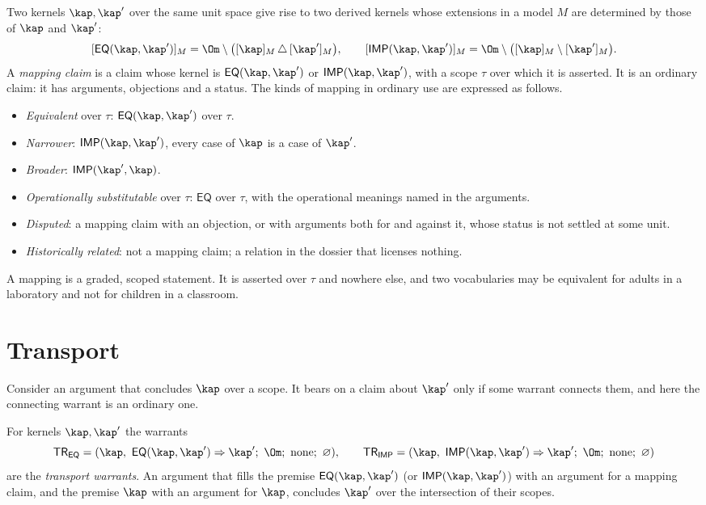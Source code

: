 Two kernels $\kap,\kap'$ over the same unit space give rise to two derived kernels whose extensions in a model $M$ are determined by those of $\kap$ and $\kap'$:
\[
[\mathsf{EQ}(\kap,\kap')]_M=\Om\setminus\bigl([\kap]_M\,\triangle\,[\kap']_M\bigr),\qquad
[\mathsf{IMP}(\kap,\kap')]_M=\Om\setminus\bigl([\kap]_M\setminus[\kap']_M\bigr).
\]
A \emph{mapping claim} is a claim whose kernel is $\mathsf{EQ}(\kap,\kap')$ or $\mathsf{IMP}(\kap,\kap')$, with a scope $\tau$ over which it is asserted. It is an ordinary claim: it has arguments, objections and a status. The kinds of mapping in ordinary use are expressed as follows.
\begin{itemize}
\item \emph{Equivalent} over $\tau$: $\mathsf{EQ}(\kap,\kap')$ over $\tau$.
\item \emph{Narrower}: $\mathsf{IMP}(\kap,\kap')$, every case of $\kap$ is a case of $\kap'$.
\item \emph{Broader}: $\mathsf{IMP}(\kap',\kap)$.
\item \emph{Operationally substitutable} over $\tau$: $\mathsf{EQ}$ over $\tau$, with the operational meanings named in the arguments.
\item \emph{Disputed}: a mapping claim with an objection, or with arguments both for and against it, whose status is not settled at some unit.
\item \emph{Historically related}: not a mapping claim; a relation in the dossier that licenses nothing.
\end{itemize}
A mapping is a graded, scoped statement. It is asserted over $\tau$ and nowhere else, and two vocabularies may be equivalent for adults in a laboratory and not for children in a classroom.

\section{Transport}\label{sec:transport}

Consider an argument that concludes $\kap$ over a scope. It bears on a claim about $\kap'$ only if some warrant connects them, and here the connecting warrant is an ordinary one.

\begin{definition}\label{def:transport}
For kernels $\kap,\kap'$ the warrants
\[
\mathsf{TR}_{\mathsf{EQ}}=(\kap,\ \mathsf{EQ}(\kap,\kap')\Rightarrow\kap';\ \Om;\ \mathrm{none};\ \varnothing),\qquad
\mathsf{TR}_{\mathsf{IMP}}=(\kap,\ \mathsf{IMP}(\kap,\kap')\Rightarrow\kap';\ \Om;\ \mathrm{none};\ \varnothing)
\]
are the \emph{transport warrants}. An argument that fills the premise $\mathsf{EQ}(\kap,\kap')$ (or $\mathsf{IMP}(\kap,\kap')$) with an argument for a mapping claim, and the premise $\kap$ with an argument for $\kap$, concludes $\kap'$ over the intersection of their scopes.
\end{definition}

